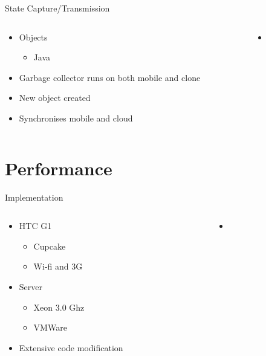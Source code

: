 \documentclass{beamer}
\begin{document}
\begin{frame}{State Capture/Transmission}
\begin{columns}
\begin{column}{5cm}
\begin{itemize}
	\item Objects
	\begin{itemize}
		\item Java
	\end{itemize}
	\item Garbage collector runs on both mobile and clone
	\item New object created
	\item Synchronises mobile and cloud
\end{itemize}
\end{column}
\begin{column}{5cm}
\begin{itemize}
	\begin{itemize}
		\item {}
	\end{itemize}
\end{itemize}
\end{column}
\end{columns}
\end{frame}

\section{Performance}

\begin{frame}{Implementation}
\begin{columns}
\begin{column}{5cm}
\begin{itemize}
	\item HTC G1
	\begin{itemize}
		\item Cupcake
		\item Wi-fi and 3G
	\end{itemize}
	\item Server
	\begin{itemize}
		\item Xeon 3.0 Ghz
		\item VMWare
	\end{itemize}
	\item Extensive code modification
\end{itemize}
\end{column}
\begin{column}{5cm}
\begin{itemize}
	\begin{itemize}
		\item {}
	\end{itemize}
\end{itemize}
\end{column}
\end{columns}
\end{frame}
\end{document}
